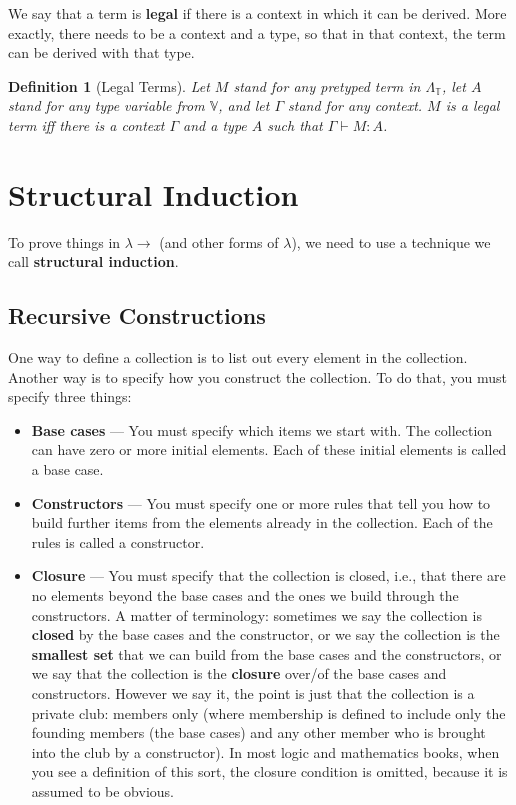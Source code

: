 \documentclass{book}
\numberwithin{equation}{chapter}
\newcommand{\vocab}{\textbf}
\newtheorem{definition}{Definition}
\begin{document}
\noindent
We say that a term is \vocab{legal} if there is a context in which it can be derived. More exactly, there needs to be a context and a type, so that in that context, the term can be derived with that type.

\begin{definition}[Legal Terms]
Let $M$ stand for any pretyped term in $\Lambda_{\mathbb{T}}$, let $A$ stand for any type variable from $\mathbb{V}$, and let $\Gamma$ stand for any context. $M$ is a legal term iff there is a context $\Gamma$ and a type $A$ such that $\Gamma \vdash M : A$.
\end{definition}


\chapter{Structural Induction}

To prove things in $\lambda\rightarrow$ (and other forms of $\lambda$), we need to use a technique we call \vocab{structural induction}.


\section{Recursive Constructions}

One way to define a collection is to list out every element in the collection. Another way is to specify how you construct the collection. To do that, you must specify three things:

\begin{itemize}
\item{\vocab{Base cases} --- You must specify which items we start with. The collection can have zero or more initial elements. Each of these initial elements is called a base case.}
\item{\vocab{Constructors} --- You must specify one or more rules that tell you how to build further items from the elements already in the collection. Each of the rules is called a constructor.}
\item{\vocab{Closure} --- You must specify that the collection is closed, i.e., that there are no elements beyond the base cases and the ones we build through the constructors. A matter of terminology: sometimes we say the collection is \vocab{closed} by the base cases and the constructor, or we say the collection is the \vocab{smallest set} that we can build from the base cases and the constructors, or we say that the collection is the \vocab{closure} over/of the base cases and constructors. However we say it, the point is just that the collection is a private club: members only (where membership is defined to include only the founding members (the base cases) and any other member who is brought into the club by a constructor). In most logic and mathematics books, when you see a definition of this sort, the closure condition is omitted, because it is assumed to be obvious.}
\end{itemize}
\end{document}
